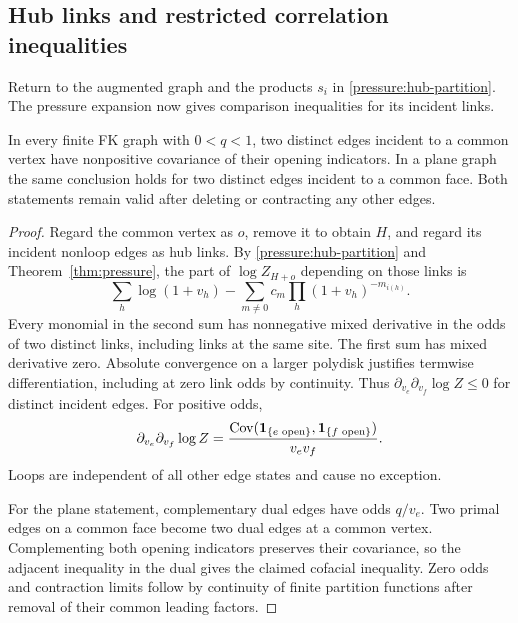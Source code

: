 \subsection{Hub links and restricted correlation inequalities}

Return to the augmented graph and the products $s_i$ in
\eqref{pressure:hub-partition}. The pressure expansion now gives
comparison inequalities for its incident links.

\begin{lemma}
\label{lem:adjacent-rayleigh}
In every finite FK graph with $0<q<1$, two distinct edges incident to
a common vertex have nonpositive covariance of their opening
indicators. In a plane graph the same conclusion holds for two
distinct edges incident to a common face. Both statements remain
valid after deleting or contracting any other edges.
\end{lemma}

\begin{proof}
Regard the common vertex as $o$, remove it to obtain $H$, and regard
its incident nonloop edges as hub links. By
\eqref{pressure:hub-partition} and Theorem~\ref{thm:pressure}, the part
of $\log Z_{H+o}$ depending on those links is
\begin{equation}
 \sum_h\log(1+v_h)
 -\sum_{m\ne0}c_m\prod_h(1+v_h)^{-m_{i(h)}}.
 \label{pressure:hub-log}
\end{equation}
Every monomial in the second sum has nonnegative mixed derivative
in the odds of two distinct links, including links at the same site.
The first sum has mixed derivative zero. Absolute convergence on a
larger polydisk justifies termwise differentiation, including at
zero link odds by continuity. Thus
$\partial_{v_e}\partial_{v_f}\log Z\le0$ for distinct incident edges.
For positive odds,
\begin{equation}
 \partial_{v_e}\partial_{v_f}\log Z
  =\frac{\operatorname{Cov}(\mathbf 1_{\{e\text{ open}\}},
                     \mathbf 1_{\{f\text{ open}\}})}{v_ev_f}.
 \label{pressure:rayleigh-derivative}
\end{equation}
Loops are independent of all other edge states and cause no exception.

For the plane statement, complementary dual edges have odds $q/v_e$.
Two primal edges on a common face become two dual edges at a common
vertex. Complementing both opening indicators preserves their
covariance, so the adjacent inequality in the dual gives the claimed
cofacial inequality. Zero odds and contraction limits follow by
continuity of finite partition functions after removal of their
common leading factors.
\end{proof}

